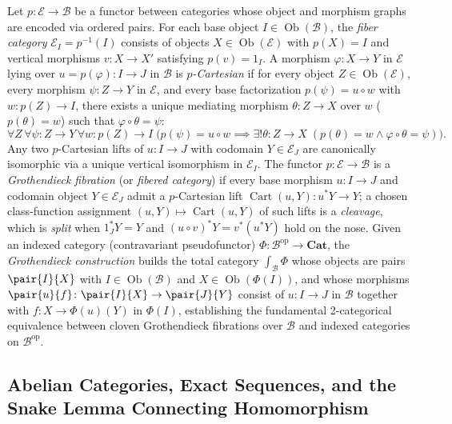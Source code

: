 Let $p\colon \mathcal{E} \to \mathcal{B}$ be a functor between categories whose object and morphism graphs are encoded via ordered pairs. For each base object $I \in \operatorname{Ob}(\mathcal{B})$, the \emph{fiber category} $\mathcal{E}_I = p^{-1}(I)$ consists of objects $X \in \operatorname{Ob}(\mathcal{E})$ with $p(X) = I$ and vertical morphisms $v\colon X \to X'$ satisfying $p(v) = 1_I$. A morphism $\varphi\colon X \to Y$ in $\mathcal{E}$ lying over $u = p(\varphi)\colon I \to J$ in $\mathcal{B}$ is \emph{$p$-Cartesian} if for every object $Z \in \operatorname{Ob}(\mathcal{E})$, every morphism $\psi\colon Z \to Y$ in $\mathcal{E}$, and every base factorization $p(\psi) = u \circ w$ with $w\colon p(Z) \to I$, there exists a unique mediating morphism $\theta\colon Z \to X$ over $w$ ($p(\theta) = w$) such that $\varphi \circ \theta = \psi$:
\[
\forall Z\,\forall \psi\colon Z \to Y\,\forall w\colon p(Z) \to I\;\bigl(p(\psi) = u \circ w \implies \exists!\theta\colon Z \to X\;(p(\theta) = w \wedge \varphi \circ \theta = \psi)\bigr).
\]
Any two $p$-Cartesian lifts of $u\colon I \to J$ with codomain $Y \in \mathcal{E}_J$ are canonically isomorphic via a unique vertical isomorphism in $\mathcal{E}_I$. The functor $p\colon \mathcal{E} \to \mathcal{B}$ is a \emph{Grothendieck fibration} (or \emph{fibered category}) if every base morphism $u\colon I \to J$ and codomain object $Y \in \mathcal{E}_J$ admit a $p$-Cartesian lift $\operatorname{Cart}(u, Y)\colon u^*Y \to Y$; a chosen class-function assignment $(u, Y) \mapsto \operatorname{Cart}(u, Y)$ of such lifts is a \emph{cleavage}, which is \emph{split} when $1_J^* Y = Y$ and $(u \circ v)^* Y = v^*(u^* Y)$ hold on the nose. Given an indexed category (contravariant pseudofunctor) $\Phi\colon \mathcal{B}^{\mathrm{op}} \to \mathbf{Cat}$, the \emph{Grothendieck construction} builds the total category $\int_{\mathcal{B}} \Phi$ whose objects are pairs $\pair{I}{X}$ with $I \in \operatorname{Ob}(\mathcal{B})$ and $X \in \operatorname{Ob}(\Phi(I))$, and whose morphisms $\pair{u}{f}\colon \pair{I}{X} \to \pair{J}{Y}$ consist of $u\colon I \to J$ in $\mathcal{B}$ together with $f\colon X \to \Phi(u)(Y)$ in $\Phi(I)$, establishing the fundamental 2-categorical equivalence between cloven Grothendieck fibrations over $\mathcal{B}$ and indexed categories on $\mathcal{B}^{\mathrm{op}}$.

\subsection{Abelian Categories, Exact Sequences, and the Snake Lemma Connecting Homomorphism}
\label{subsec:abelian_categories_exact_sequences_snake_lemma}

